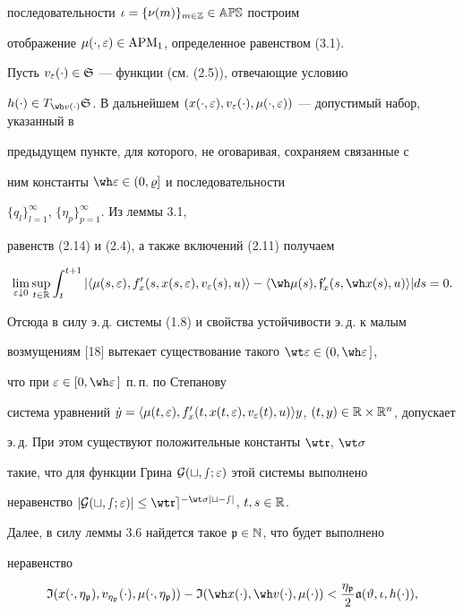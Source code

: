 последовательности $\iota=\{\nu(m)\}_{m\in\Bbb Z}\in\Bbb{APS}$ построим


отображение $\mu(\cdot,\varepsilon)\in\operatorname{APM}_1$, определенное равенством (3.1).


Пусть $v_{\varepsilon}(\cdot)\in\frak S$ --- функции (см. (2.5)), отвечающие условию


$h(\cdot)\in T_{\wh v(\cdot)}\gS$. В дальнейшем $(x(\cdot,\ve),


v_{\ve}(\cdot),\mu(\cdot,\ve))$ --- допустимый набор, указанный в


предыдущем пункте, для которого, не оговаривая, сохраняем связанные с


ним константы $\wh\ve\in(0,\vr]$ и последовательности


$\{q_l\}_{l=1}^{\infty}$, $\{\eta_p\}_{p=1}^{\infty}$. Из леммы 3.1,


равенств (2.14) и (2.4), а также включений (2.11) получаем


$$


\lim_{\ve\downarrow 0}\sup_{t\in\R}\int_{t}^{t+1}


|\la \mu(s,\ve), f_x'(s,x(s,\ve), v_{\ve}(s),u)\ra-


\la \wh\mu(s),\frak{f}_x'(s,\wh x(s),u) \ra|ds=0.


$$


Отсюда в силу э.\,д. системы (1.8) и свойства устойчивости э.\,д. к малым


возмущениям [18] вытекает существование такого $\wt\ve\in(0,\wh\ve\,]$,


что при $\ve\in[0,\wh\ve\,]$ п.\,п. по Степанову


система уравнений $\dot y=\la\mu(t,\ve),


f_x'(t,x(t,\ve), v_{\ve}(t),u)\ra y$, $(t,y)\in\R\times\R^n$, допускает


э.\,д. При этом существуют положительные константы $\wt\gr$, $\wt\sigma$


такие, что для функции Грина $\cal G(t,s;\varepsilon)$ этой системы выполнено


неравенство $|\pG(t,s;\ve)|\le\wt\gr e^{-\wt\sigma|t-s|}$, $t,s\in\Bbb R$.


Далее, в силу леммы 3.6 найдется такое ${\frak p}\in\Bbb N$, что будет выполнено


неравенство


\begin{equation}


\frak I(x(\cdot,\eta_{\ggp}), v_{\eta_{\ggp}}(\cdot), \mu(\cdot,\eta_{\ggp}))-


\frak I(\wh x(\cdot), \wh v(\cdot), \mu(\cdot))<


\frac{\eta_{\ggp}}{2}\frak a(\vt,\iota,h(\cdot)),


\end{equation}


